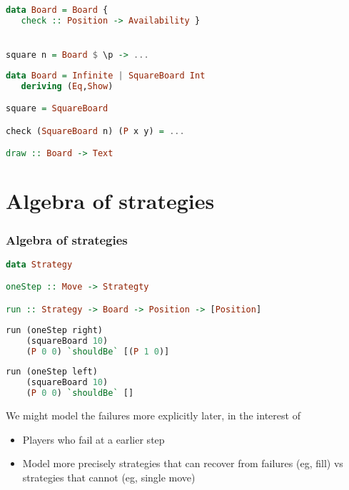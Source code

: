 \documentclass[10pt]{beamer}
\begin{document}
\begin{frame}[fragile]
\begin{lstlisting}[language=haskell, basicstyle=\ttfamily]
data Board = Board {
   check :: Position -> Availability }


square n = Board $ \p -> ...
\end{lstlisting}
\end{frame}
\begin{frame}[fragile]
\begin{lstlisting}[language=haskell, basicstyle=\ttfamily]
data Board = Infinite | SquareBoard Int
   deriving (Eq,Show)

square = SquareBoard

check (SquareBoard n) (P x y) = ...

draw :: Board -> Text
\end{lstlisting}
\end{frame}
\section{Algebra of strategies}
\begin{frame}[fragile]
  \frametitle{Algebra of strategies}
\begin{lstlisting}[language=haskell, basicstyle=\ttfamily]
data Strategy

oneStep :: Move -> Strategty

run :: Strategy -> Board -> Position -> [Position]
\end{lstlisting}
\end{frame}
\begin{frame}[fragile]
\begin{lstlisting}[language=haskell, basicstyle=\ttfamily]
run (oneStep right)
    (squareBoard 10)
    (P 0 0) `shouldBe` [(P 1 0)]
\end{lstlisting}
\end{frame}
\begin{frame}[fragile]
\begin{lstlisting}[language=haskell, basicstyle=\ttfamily]
run (oneStep left)
    (squareBoard 10)
    (P 0 0) `shouldBe` []
\end{lstlisting}
\end{frame}

\begin{frame}[fragile]
  We might model the failures more explicitly later, in the interest of 
  \begin{itemize}
    \item Players who fail at a earlier step 
    \item Model more precisely strategies that can recover from failures (eg, fill) vs strategies that cannot (eg, single move) 
  \end{itemize}
\end{frame}
\end{document}
